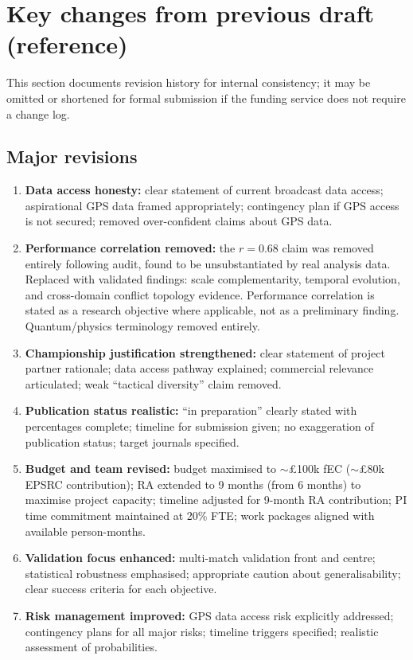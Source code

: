 \section{Key changes from previous draft (reference)}

This section documents revision history for internal consistency; it may be omitted or shortened for formal submission if the funding service does not require a change log.

\subsection{Major revisions}

\begin{enumerate}[label=\arabic*.]
  \item \textbf{Data access honesty:} clear statement of current broadcast data access; aspirational GPS data framed appropriately; contingency plan if GPS access is not secured; removed over-confident claims about GPS data.

  \item \textbf{Performance correlation removed:} the $r = 0.68$ claim was removed entirely following audit, found to be unsubstantiated by real analysis data. Replaced with validated findings: scale complementarity, temporal evolution, and cross-domain conflict topology evidence. Performance correlation is stated as a research objective where applicable, not as a preliminary finding. Quantum/physics terminology removed entirely.

  \item \textbf{Championship justification strengthened:} clear statement of project partner rationale; data access pathway explained; commercial relevance articulated; weak ``tactical diversity'' claim removed.

  \item \textbf{Publication status realistic:} ``in preparation'' clearly stated with percentages complete; timeline for submission given; no exaggeration of publication status; target journals specified.

  \item \textbf{Budget and team revised:} budget maximised to $\sim$\pounds100k fEC ($\sim$\pounds80k EPSRC contribution); RA extended to 9 months (from 6 months) to maximise project capacity; timeline adjusted for 9-month RA contribution; PI time commitment maintained at 20\% FTE; work packages aligned with available person-months.

  \item \textbf{Validation focus enhanced:} multi-match validation front and centre; statistical robustness emphasised; appropriate caution about generalisability; clear success criteria for each objective.

  \item \textbf{Risk management improved:} GPS data access risk explicitly addressed; contingency plans for all major risks; timeline triggers specified; realistic assessment of probabilities.
\end{enumerate}

